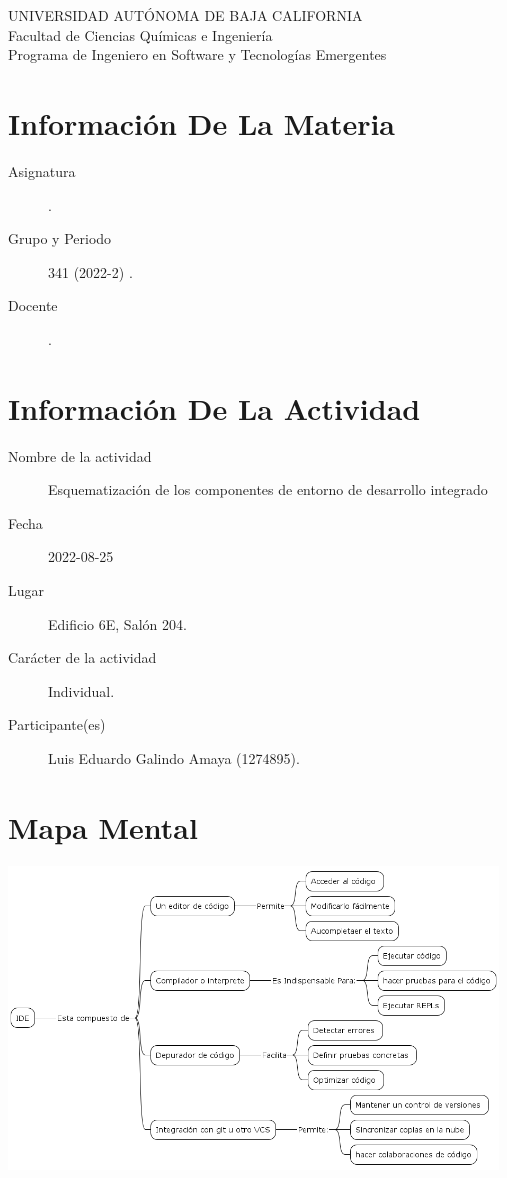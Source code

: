\documentclass[12pt]{article}
\begin{document}
\thispagestyle{empty}
\begin{center}
	{\large
		UNIVERSIDAD AUTÓNOMA DE BAJA CALIFORNIA \\
		Facultad de Ciencias Químicas e Ingeniería }
	\vspace{0.25in} \\
	Programa de Ingeniero en Software y Tecnologías Emergentes
\end{center}

\section*{Información De La Materia}
\label{sec:org184e77f}
\begin{mdframed}
\begin{description}
\item[{Asignatura}] \asignatura .
\item[{Grupo y Periodo}] 341 (2022-2) .
\item[{Docente}] \docente .
\end{description}
\end{mdframed}

\section*{Información De La Actividad}
\label{sec:orged7e074}
\begin{mdframed}
\begin{description}
\item[{Nombre de la actividad}] Esquematización de los componentes de entorno de desarrollo integrado
\item[{Fecha}] 2022-08-25
\item[{Lugar}] Edificio 6E, Salón 204.
\item[{Carácter de la actividad}] Individual.
\item[{Participante(es)}] Luis Eduardo Galindo Amaya (1274895).
\end{description}
\end{mdframed}

\section*{Mapa Mental}
\label{sec:org21f0c71}
\begin{center}
\includegraphics[width=13cm]{./img/mapa.png}
\end{center}
\end{document}
